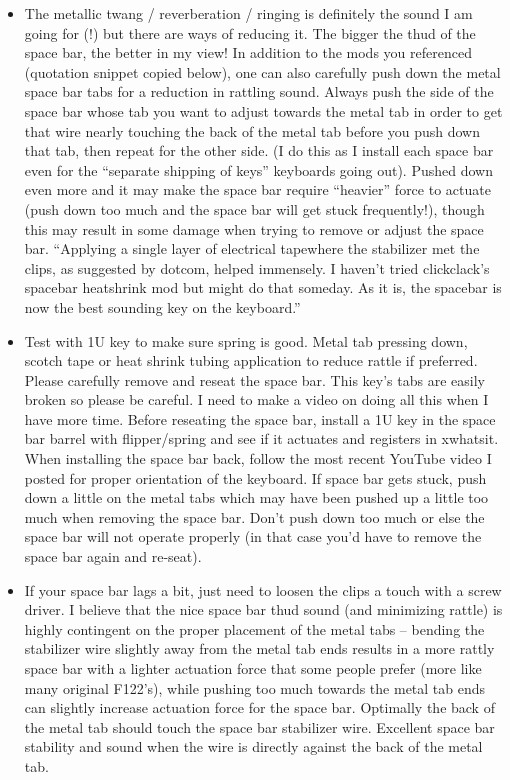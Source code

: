\documentclass[a5paper, twoside]{memoir}
\begin{document}
\begin{enumerate}
\begin{itemize}
\item         The metallic twang / reverberation / ringing is definitely the sound I am going for (!) but there are ways of reducing it. The bigger the thud of the space bar, the better in my view! In addition to the mods you referenced (quotation snippet copied below), one can also carefully push down the metal space bar tabs for a reduction in rattling sound. Always push the side of the space bar whose tab you want to adjust towards the metal tab in order to get that wire nearly touching the back of the metal tab before you push down that tab, then repeat for the other side. (I do this as I install each space bar even for the “separate shipping of keys” keyboards going out). Pushed down even more and it may make the space bar require “heavier” force to actuate (push down too much and the space bar will get stuck frequently!), though this may result in some damage when trying to remove or adjust the space bar.  “Applying a single layer of electrical tapewhere the stabilizer met the clips, as suggested by dotcom, helped immensely. I haven’t tried clickclack’s spacebar heatshrink mod but might do that someday. As it is, the spacebar is now the best sounding key on the keyboard.”
\item         Test with 1U key to make sure spring is good. Metal tab pressing down, scotch tape or heat shrink tubing application to reduce rattle if preferred. Please carefully remove and reseat the space bar. This key’s tabs are easily broken so please be careful. I need to make a video on doing all this when I have more time. Before reseating the space bar, install a 1U key in the space bar barrel with flipper/spring and see if it actuates and registers in xwhatsit. When installing the space bar back, follow the most recent YouTube video I posted for proper orientation of the keyboard. If space bar gets stuck, push down a little on the metal tabs which may have been pushed up a little too much when removing the space bar. Don’t push down too much or else the space bar will not operate properly (in that case you’d have to remove the space bar again and re-seat).
\item         If your space bar lags a bit, just need to loosen the clips a touch with a screw driver.  I believe that the nice space bar thud sound (and minimizing rattle) is highly contingent on the proper placement of the metal tabs – bending the stabilizer wire slightly away from the metal tab ends results in a more rattly space bar with a lighter actuation force that some people prefer (more like many original F122’s), while pushing too much towards the metal tab ends can slightly increase actuation force for the space bar. Optimally the back of the metal tab should touch the space bar stabilizer wire. Excellent space bar stability and sound when the wire is directly against the back of the metal tab.

\end{itemize}
\end{enumerate}
\end{document}
